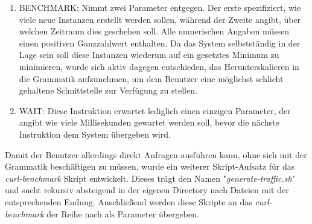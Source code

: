 \begin{enumerate}
  \item BENCHMARK: Nimmt zwei Parameter entgegen. Der erste spezifiziert, wie viele neue Instanzen erstellt werden sollen, während der Zweite angibt, über welchen Zeitraum dies geschehen soll. Alle numerischen Angaben müssen einen positiven Ganzzahlwert enthalten. Da das System selbstständig in der Lage sein soll diese Instanzen wiederum auf ein gesetztes Minimum zu minimieren, wurde sich aktiv dagegen entschieden, das Herunterskalieren in die Grammatik aufzunehmen, um dem Benutzer eine möglichst schlicht gehaltene Schnittstelle zur Verfügung zu stellen.
  \item WAIT: Diese Instruktion erwartet lediglich einen einzigen Parameter, der angibt wie viele Millisekunden gewartet werden soll, bevor die nächste Instruktion dem System übergeben wird. 
\end{enumerate}


Damit der Benutzer allerdings direkt Anfragen ausführen kann, ohne sich mit der Grammatik beschäftigen zu müssen, wurde ein weiterer Skript-Aufsatz 
für das \emph{curl-benchmark} Skript entwickelt. Dieses trägt den Namen "\emph{generate-traffic.sh}" und sucht rekursiv absteigend in der eigenen Directory nach Dateien mit der entsprechenden Endung. Anschließend werden diese Skripte an das \emph{curl-benchmark} der Reihe nach als Parameter übergeben.

